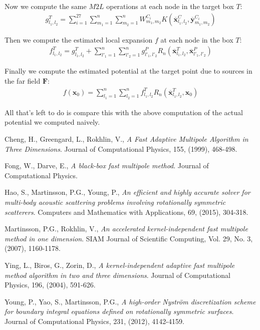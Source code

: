 \documentclass[11pt, oneside]{article}   	%
\begin{document}
\begin{appendices}
Now we compute the same $M2L$ operations at each node in the target box $T$:
\begin{align}
g^T_{l_1,l_2} = \sum_{i=1}^{27}\sum_{m_1=1}^n\sum_{m_2=1}^n W_{m_1,m_2}^{C_i}K(\mathbf{\overline{x}}^C_{l_1,l_2},\mathbf{\overline{y}}^{C_i}_{m_1,m_2})
\end{align}

Then we compute the estimated local expansion $f$ at each node in the box $T$:
\begin{align}
f^T_{l_1,l_2} = g^T_{l_1,l_2} + \sum_{l'_1=1}^n\sum_{l'_2=1}^n g^P_{l'_1,l'_2}R_n(\mathbf{\overline{x}}^T_{l_1,l_2},\mathbf{\overline{x}}^P_{l'_1,l'_2})
\end{align}

Finally we compute the estimated potential at the target point due to sources in the far field $\mathbf{F}$:
\begin{align}
f(\mathbf{x}_0) = \sum_{l_1=1}^n\sum_{l_2=1}^n f^T_{l_1,l_2} R_n(\mathbf{\overline{x}}^T_{l_1,l_2},\mathbf{x}_0)
\end{align}

All that's left to do is compare this with the above computation of the actual potential we computed naively.

\end{appendices}

\begin{thebibliography}{99}

 Cheng, H., Greengard, L., Rokhlin, V., \emph{A Fast Adaptive Multipole Algorithm in Three Dimensions}. Journal of Computational Physics, 155, (1999), 468-498.

 Fong, W., Darve, E., \emph{A black-box fast multipole method}. Journal of Computational Physics.

 Hao, S., Martinsson, P.G., Young, P., \emph{An efficient and highly accurate solver for multi-body acoustic scattering problems involving rotationally symmetric scatterers}. Computers and Mathematics with Applications, 69, (2015), 304-318.

 Martinsson, P.G., Rokhlin, V., \emph{An accelerated kernel-independent fast multipole method in one dimension}. SIAM Journal of Scientific Computing, Vol. 29, No. 3, (2007), 1160-1178.

 Ying, L., Biros, G., Zorin, D., \emph{A kernel-independent adaptive fast multipole method algorithm in two and three dimensions}. Journal of Computational Physics, 196, (2004), 591-626.

 Young, P., Yao, S., Martinsson, P.G., \emph{A high-order Nystr{\"o}m discretization scheme for boundary integral equations defined on rotationally symmetric surfaces}. Journal of Computational Physics, 231, (2012), 4142-4159.

\end{thebibliography}
\end{document}
